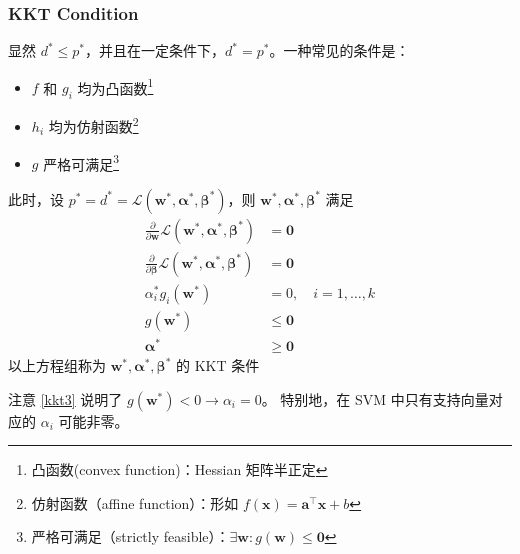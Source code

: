 	\subsubsection{KKT Condition}\label{sec-kkt}
		显然 $ d^* \leq p^* $，并且在一定条件下，$ d^* = p^* $。一种常见的条件是：
		\begin{itemize}
			\item $ f $ 和 $ g_i $ 均为凸函数\footnote{凸函数(convex function)：Hessian 矩阵半正定}
			\item $ h_i $ 均为仿射函数\footnote{仿射函数（affine function）：形如 $ f(\bm{x}) = \bm{a}^\intercal \bm{x} + b $}
			\item $ g $ 严格可满足\footnote{严格可满足（strictly feasible）：$ \exists \bm{w}: g(\bm{w}) \leq \bm{0} $}
		\end{itemize}
		
		此时，设 $ p^* = d^* = \mathcal{L}(\bm{w}^*, \bm{\alpha}^*, \bm{\beta}^*) $，则 $ \bm{w}^*, \bm{\alpha}^*, \bm{\beta}^* $ 满足
		\begin{align}
		\frac{\partial}{\partial \bm{w}} \mathcal{L}(\bm{w}^*, \bm{\alpha}^*, \bm{\beta}^*) &= \bm{0}\label{kkt1} \\
		\frac{\partial}{\partial \bm{\beta}} \mathcal{L}(\bm{w}^*, \bm{\alpha}^*, \bm{\beta}^*) &= \bm{0} \\
		\alpha_i^* g_i(\bm{w}^*) &=0, \quad i = 1,\ldots,k \label{kkt3}\\
		g(\bm{w}^*) & \leq \bm{0} \\
		\bm{\alpha}^* & \geq \bm{0}
		\end{align}
		以上方程组称为 $ \bm{w}^*, \bm{\alpha}^*, \bm{\beta}^* $ 的 KKT 条件
		
		注意 \eqref{kkt3} 说明了 $ g(\bm{w}^*) < 0 \to \alpha_i = 0 $。
		特别地，在 SVM 中只有支持向量对应的 $ \alpha_i $ 可能非零。
		
